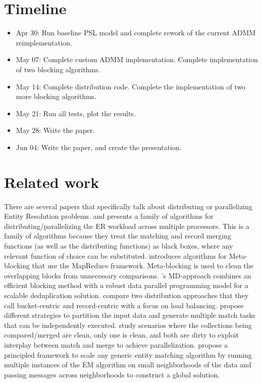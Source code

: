 \documentclass{article}
\begin{document}
\section{Timeline}
\begin{itemize}
    \item Apr 30: Run baseline PSL model and complete rework of the current ADMM reimplementation.
    \item May 07: Complete custom ADMM implementation. Complete implementation of two blocking algorithms.
    \item May 14: Complete distribution code. Complete the implementation of two more blocking algorithms.
    \item May 21: Run all tests, plot the results.
    \item May 28: Write the paper.
    \item Jun 04: Write the paper, and create the presentation.
\end{itemize}

\section{Related work}
There are several papers that specifically talk about distributing or parallelizing Entity Resolution problems. \cite{benjelloun2007d} and \cite{kawai2006p} presents a family of algorithms for distributing/parallelizing the ER workload across multiple processors. This is a family of algorithms because they treat the matching and record merging functions (as well as the distributing functions) as black boxes, where any relevant function of choice can be substituted. \cite{efthymiou2017parallel} introduces algorithms for Meta-blocking that use the MapReduce framework. Meta-blocking is used to clean the overlapping blocks from unnecessary comparisons. \cite{dal2011fast}'s MD-approach combines an efficient blocking method with a robust data parallel programming model for a scalable deduplication solution. \cite{malhotra2014graph} compare two distribution approaches that they call bucket-centric and record-centric with a focus on load balancing. \cite{kirsten2010data} propose different strategies to partition the input data and generate multiple match tasks that can be independently executed. \cite{kim2007parallel} study scenarios where the collections being compared/merged are clean, only one is clean, and both are dirty to exploit interplay between match and merge to achieve parallelization. \cite{rastogi2011large} propose a principled framework to scale any generic entity matching algorithm by running multiple instances of the EM algorithm on small neighborhoods of the data and passing messages across neighborhoods to construct a global solution.

 

\end{document}
